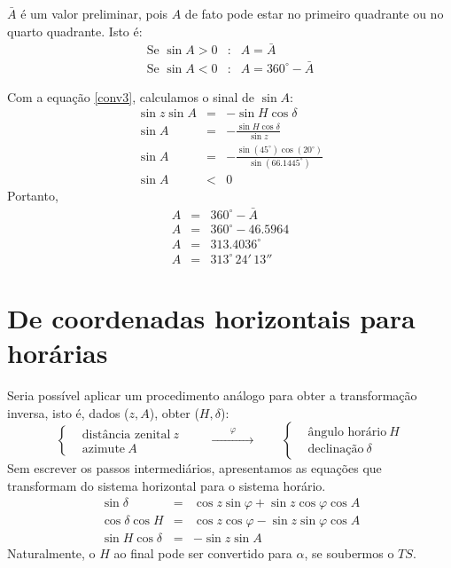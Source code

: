 \begin{exemplo}{9}
$\bar{A}$ é um valor preliminar, pois $A$ de fato pode estar no primeiro quadrante ou no quarto quadrante. Isto é:
%
\begin{eqnarray*}
\text{Se~} \sin A > 0 &:& A = \bar{A} \\
\text{Se~} \sin A < 0 &:& A = 360^{\circ} - \bar{A}
\end{eqnarray*}

Com a equação \ref{conv3}, calculamos o sinal de  $\sin A$:
%
\begin{eqnarray*} 
\sin z \sin A &=& -\sin H \cos \delta \\
\sin A &=& -\frac{\sin H \cos \delta}{\sin z}\\
\sin A &=& -\frac{\sin(45^{\circ}) \cos(20^{\circ})}{\sin(66.1445^{\circ})}\\
\sin A &<& 0
\end{eqnarray*} 
%
Portanto,
\begin{eqnarray*} 
A &=& 360^{\circ} - \bar{A} \\
A &=& 360^{\circ} - 46.5964 \\
A &=& 313.4036^{\circ} \\
A &=& 313^{\circ}\,24'\,13''
\end{eqnarray*} 

\end{exemplo}


\section{De coordenadas horizontais para horárias}

Seria possível aplicar um procedimento análogo para obter a transformação inversa, isto é, dados ($z, A$), obter ($H, \delta$):
%
\begin{equation*}
\left\{
\begin{aligned}
& \text{distância zenital}~z\\
& \text{azimute}~A
\end{aligned}
\right.
\qquad \xrightarrow[\hspace{2cm}]{\varphi} \qquad
\left\{
\begin{aligned}
& \text{ângulo horário}~H\\
& \text{declinação}~\delta
\end{aligned}
\right.
\end{equation*}
%
Sem escrever os passos intermediários, apresentamos as equações que transformam do sistema horizontal para o sistema horário. 
%
\begin{eqnarray}
\sin \delta &=& \cos z \sin \varphi + \sin z \cos \varphi \cos A \label{inv1} \\
\cos \delta \cos H &=& \cos z \cos \varphi - \sin z \sin \varphi \cos A \label{inv2} \\
\sin H \cos \delta &=& -\sin z \sin A \label{inv3}
\end{eqnarray}
%
Naturalmente, o $H$ ao final pode ser convertido para $\alpha$, se soubermos o $TS$.
